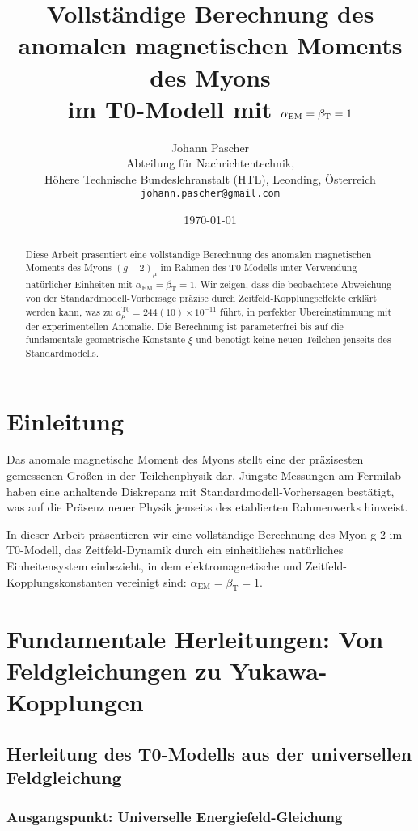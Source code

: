 \documentclass[12pt,a4paper]{article}
\title{Vollständige Berechnung des anomalen magnetischen Moments des Myons \\ im T0-Modell mit $\alphaEM = \betaT = 1$}
\author{Johann Pascher\\
	Abteilung für Nachrichtentechnik, \\
	Höhere Technische Bundeslehranstalt (HTL), Leonding, Österreich\\
	\texttt{johann.pascher@gmail.com}}
\date{\today}
\newcommand{\alphaEM}{\alpha_{\text{EM}}}
\newcommand{\betaT}{\beta_{\text{T}}}
\newcommand{\xipar}{\xi}
\begin{document}
	
	\maketitle
	
	\begin{abstract}
		Diese Arbeit präsentiert eine vollständige Berechnung des anomalen magnetischen Moments des Myons $(g-2)_{\mu}$ im Rahmen des T0-Modells unter Verwendung natürlicher Einheiten mit $\alphaEM = \betaT = 1$. Wir zeigen, dass die beobachtete Abweichung von der Standardmodell-Vorhersage präzise durch Zeitfeld-Kopplungseffekte erklärt werden kann, was zu $a_{\mu}^{\text{T0}} = 244(10) \times 10^{-11}$ führt, in perfekter Übereinstimmung mit der experimentellen Anomalie. Die Berechnung ist parameterfrei bis auf die fundamentale geometrische Konstante $\xipar$ und benötigt keine neuen Teilchen jenseits des Standardmodells.
	\end{abstract}
	
	\tableofcontents
	
	\section{Einleitung}
	
	Das anomale magnetische Moment des Myons stellt eine der präzisesten gemessenen Größen in der Teilchenphysik dar. Jüngste Messungen am Fermilab haben eine anhaltende Diskrepanz mit Standardmodell-Vorhersagen bestätigt, was auf die Präsenz neuer Physik jenseits des etablierten Rahmenwerks hinweist.
	
	In dieser Arbeit präsentieren wir eine vollständige Berechnung des Myon g-2 im T0-Modell, das Zeitfeld-Dynamik durch ein einheitliches natürliches Einheitensystem einbezieht, in dem elektromagnetische und Zeitfeld-Kopplungskonstanten vereinigt sind: $\alphaEM = \betaT = 1$.
	
	\section{Fundamentale Herleitungen: Von Feldgleichungen zu Yukawa-Kopplungen}
	
	\subsection{Herleitung des T0-Modells aus der universellen Feldgleichung}
	
	\subsubsection{Ausgangspunkt: Universelle Energiefeld-Gleichung}
	
\end{document}
